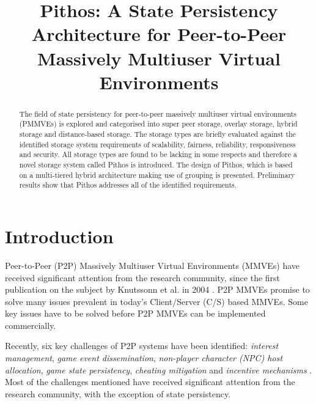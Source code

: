 \documentclass[10pt,a4paper,conference]{IEEEtran}
\begin{document}
%
\title{Pithos: A State Persistency Architecture for Peer-to-Peer Massively Multiuser Virtual Environments}


\maketitle

\begin{abstract}
The field of state persistency for peer-to-peer massively multiuser virtual environments (PMMVEs) is explored and categorised into super peer
storage, overlay storage, hybrid storage and distance-based storage. The storage types are briefly evaluated against the identified storage system
requirements of scalability, fairness, reliability, responsiveness and security. All storage types are found to be lacking in some respects and
therefore a novel storage system called Pithos is introduced. The design of Pithos, which is based on a multi-tiered hybrid architecture making use
of grouping is presented. Preliminary results show that Pithos addresses all of the identified requirements.

\end{abstract}


\section{Introduction}
\label{introduction}

Peer-to-Peer (P2P) Massively Multiuser Virtual Environments (MMVEs) have received significant attention from the research community, since the first
publication on the subject by Knutssonn et al. in 2004 \cite{knutsson_p2p_first}. P2P MMVEs promise to solve many issues prevalent in today's
Client/Server (C/S) based MMVEs. Some key issues have to be solved before P2P MMVEs can be implemented commercially.

Recently, six key challenges of P2P systems have been identified: \emph{interest management}, \emph{game event dissemination}, \emph{non-player
character (NPC) host allocation}, \emph{game state persistency}, \emph{cheating mitigation} and \emph{incentive mechanisms}
\cite{Fan_deisgn_issues_p2p}. Most of the challenges mentioned have received significant attention from the research community, with the exception of
state persistency.
\end{document}
